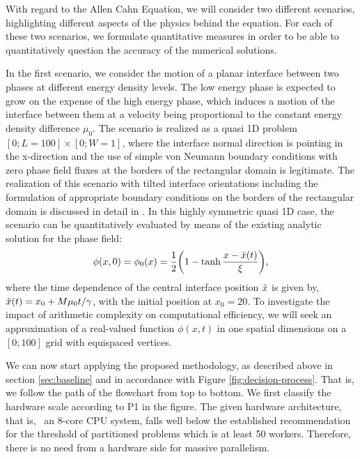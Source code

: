 \documentclass[sn-mathphys,Numbered]{sn-jnl}%
\theoremstyle{thmstyleone}%
\theoremstyle{thmstyletwo}%
\theoremstyle{thmstylethree}%
\begin{document}
With regard to the Allen Cahn Equation, we will consider two different scenarios, highlighting different aspects of the physics behind the equation. 
For each of these two scenarios, we formulate quantitative measures in order to be able to quantitatively question the accuracy of the numerical solutions.

In the first scenario, we consider the motion of a planar interface between two phases at different energy density levels. 
The low energy phase is expected to grow on the expense of the high energy phase, which induces a motion of the interface between them at a velocity being proportional to the constant energy density difference $\mu_0$.
The scenario is realized as a quasi 1D problem $[0;L=100]\times[0;W=1]$, where the interface normal direction is pointing in the x-direction and the use of simple von Neumann boundary conditions with zero phase field fluxes at the borders of the rectangular domain is legitimate. 
The realization of this scenario with tilted interface orientations including the formulation of appropriate boundary conditions on  the borders of the rectangular domain is discussed in detail in \cite{fleckFrictionlessMotionDiffuse2022}.
In this highly symmetric quasi 1D case, the scenario can be quantitatively evaluated by means of the existing analytic solution for the phase field:
\begin{align}
    \phi(x,0) = \phi_0(x) = \frac{1}{2} \left(1 - \tanh{\frac{x - \Tilde{x}(t)}{\xi}}\right) , \label{eq:ac-analytical}
\end{align}
where the time dependence of the central interface position $\Tilde{x}$ is given by, $\Tilde{x}(t) = x_0 + {M \mu_0 t}  /{\gamma}$, with the initial position at $x_0 = 20$.
To investigate the impact of arithmetic complexity on computational efficiency, we will seek an approximation of a real-valued function $\phi (x,t)$ in one spatial dimensions on a $[0;100]$ grid with equispaced vertices. 


We can now start applying the proposed methodology, as described above in section \ref{sec:baseline} and in accordance with Figure \ref{fig:decision-process}.
That is, we follow the path of the flowchart from top to bottom.
We first classify the hardware scale according to P1 in the figure.
The given hardware architecture, that is, ~an 8-core CPU system, falls well below the established recommendation for the threshold of partitioned problems which is at least 50 workers.
Therefore, there is no need from a hardware side for massive parallelism.
\end{document}
